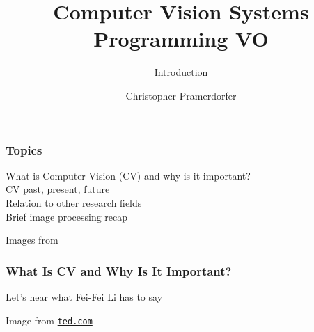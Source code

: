 \documentclass[xetex,professionalfont]{beamer}
\title{Computer Vision Systems Programming VO}
\subtitle{Introduction}
\author{Christopher Pramerdorfer}
\institute{Computer Vision Lab, Vienna University of Technology}
\begin{document}

\begin{frame}
\maketitle
\end{frame}


\begin{frame}
\frametitle{Topics}

What is Computer Vision (CV) and why is it important?\\\medskip
CV past, present, future\\\medskip
Relation to other research fields\\\medskip
Brief image processing recap

\bigskip
\begin{center}
    {\centering Images from \cite{prince12}}
\end{center}

\end{frame}


\begin{frame}
\frametitle{What Is CV and Why Is It Important?}

Let's hear what Fei-Fei Li has to say

\bigskip
\begin{center}
    {\centering Image from \href{https://www.ted.com/talks/fei_fei_li_how_we_re_teaching_computers_to_understand_pictures}{\texttt{ted.com}}}
\end{center}

\end{frame}
\end{document}
